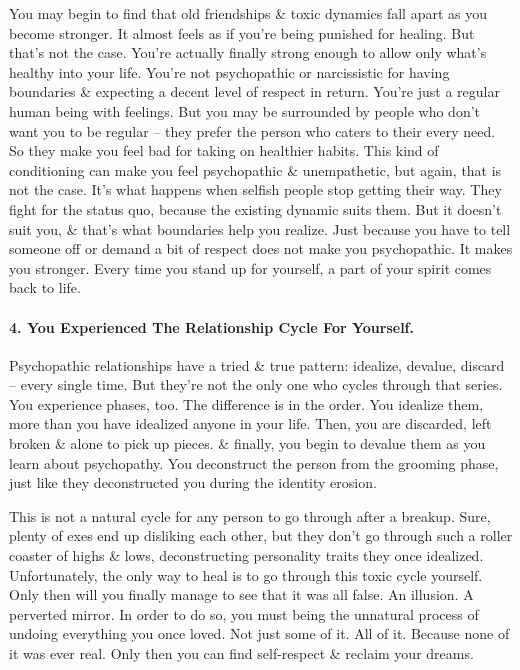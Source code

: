 \documentclass{article}
\numberwithin{equation}{section}
\begin{document}
You may begin to find that old friendships \& toxic dynamics fall apart as you become stronger. It almost feels as if you're being punished for healing. But that's not the case. You're actually finally strong enough to allow only what's healthy into your life. You're not psychopathic or narcissistic for having boundaries \& expecting a decent level of respect in return. You're just a regular human being with feelings. But you may be surrounded by people who don't want you to be regular -- they prefer the person who caters to their every need. So they make you feel bad for taking on healthier habits. This kind of conditioning can make you feel psychopathic \& unempathetic, but again, that is not the case. It's what happens when selfish people stop getting their way. They fight for the status quo, because the existing dynamic suits them. But it doesn't suit you, \& that's what boundaries help you realize. Just because you have to tell someone off or demand a bit of respect does not make you psychopathic. It makes you stronger. Every time you stand up for yourself, a part of your spirit comes back to life.

\paragraph{4. You Experienced The Relationship Cycle For Yourself.} Psychopathic relationships have a tried \& true pattern: idealize, devalue, discard -- every single time. But they're not the only one who cycles through that series. You experience phases, too. The difference is in the order. You idealize them, more than you have idealized anyone in your life. Then, you are discarded, left broken \& alone to pick up pieces. \& finally, you begin to devalue them as you learn about psychopathy. You deconstruct the person from the grooming phase, just like they deconstructed you during the identity erosion.

This is not a natural cycle for any person to go through after a breakup. Sure, plenty of exes end up disliking each other, but they don't go through such a roller coaster of highs \& lows, deconstructing personality traits they once idealized. Unfortunately, the only way to heal is to go through this toxic cycle yourself. Only then will you finally manage to see that it was all false. An illusion. A perverted mirror. In order to do so, you must being the unnatural process of undoing everything you once loved. Not just some of it. All of it. Because none of it was ever real. Only then you can find self-respect \& reclaim your dreams.
\end{document}
